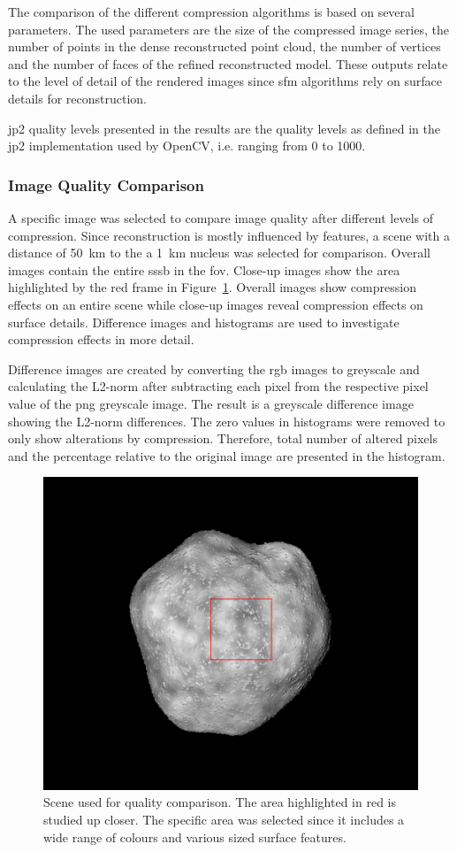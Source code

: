 The comparison of the different compression algorithms is based on several parameters. The used parameters are the size of the compressed image series, the number of points in the dense reconstructed point cloud, the number of vertices and the number of faces of the refined reconstructed model. These outputs relate to the level of detail of the rendered images since \gls{sfm} algorithms rely on surface details for reconstruction.

\Gls{jp2} quality levels presented in the results are the quality levels as defined in the \gls{jp2} implementation used by OpenCV, i.e. ranging from 0 to 1000.

\subsubsection{Image Quality Comparison} \label{sec:img_quali_comp}
A specific image was selected to compare image quality after different levels of compression. Since reconstruction is mostly influenced by features, a scene with a distance of \SI{50}{\kilo\meter} to the a \SI{1}{\kilo\meter} nucleus was selected for comparison. Overall images contain the entire \gls{sssb} in the \gls{fov}. Close-up images show the area highlighted by the red frame in Figure~\ref{fig:img_quality_frame}. Overall images show compression effects on an entire scene while close-up images reveal compression effects on surface details. Difference images and histograms are used to investigate compression effects in more detail. 

Difference images are created by converting the \gls{rgb} images to greyscale and calculating the L2-norm after subtracting each pixel from the respective pixel value of the \gls{png} greyscale image. The result is a greyscale difference image showing the L2-norm differences. The zero values in histograms were removed to only show alterations by compression. Therefore, total number of altered pixels and the percentage relative to the original image are presented in the histogram.

\begin{figure}[htb]
    \centering
    \includegraphics[width=.7\textwidth]{doc/thesis/0_figures/compare_quality/set1/jp2_1000_frame}
    \caption{Scene used for quality comparison. The area highlighted in red is studied up closer. The specific area was selected since it includes a wide range of colours and various sized surface features.}
    \label{fig:img_quality_frame}
\end{figure}

